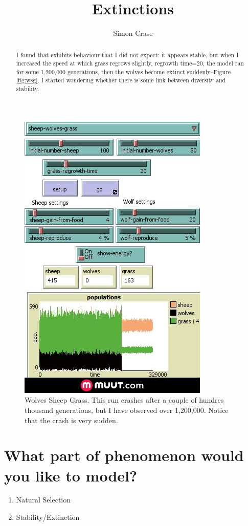 \documentclass[]{article}
\title{Extinctions}
\author{Simon Crase}
\begin{document}
\maketitle

\begin{abstract}
I found that \cite{Wilensky:1997} exhibits behaviour that I did not expect: it appears stable, but when I increased the speed at which grass regrows slightly, regrowth time=20, the model ran for some 1,200,000 generations, then the wolves become extinct suddenly--Figure \ref{fig:wsg}. I started wondering whether there is some link between diversity and stability.
\end{abstract}

\begin{figure}[b]
	\centering
	\includegraphics[width=0.5\linewidth]{wsg20.jpg}
	\caption{Wolves Sheep Grass. This run crashes after a couple of hundres thousand generations, but I have observed over 1,200,000. Notice that the crash is very sudden.}
	\label{fig:wsg}
\end{figure}

\section{What part of phenomenon would you like to model?}

\begin{enumerate}
	\item Natural Selection
	\item Stability/Extinction
\end{enumerate}
\end{document}
